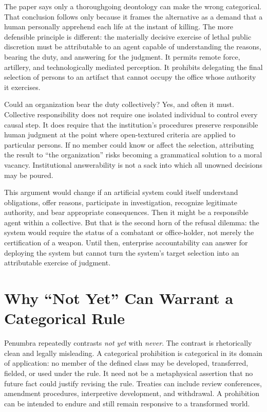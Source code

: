 \documentclass[11pt]{article}
\begin{document}
The paper says only a thoroughgoing deontology can make the wrong categorical. That conclusion follows only because it frames the alternative as a demand that a human personally apprehend each life at the instant of killing. The more defensible principle is different: the materially decisive exercise of lethal public discretion must be attributable to an agent capable of understanding the reasons, bearing the duty, and answering for the judgment. It permits remote force, artillery, and technologically mediated perception. It prohibits delegating the final selection of persons to an artifact that cannot occupy the office whose authority it exercises.

Could an organization bear the duty collectively? Yes, and often it must. Collective responsibility does not require one isolated individual to control every causal step. It does require that the institution's procedures preserve responsible human judgment at the point where open-textured criteria are applied to particular persons. If no member could know or affect the selection, attributing the result to ``the organization'' risks becoming a grammatical solution to a moral vacancy. Institutional answerability is not a sack into which all unowned decisions may be poured.

This argument would change if an artificial system could itself understand obligations, offer reasons, participate in investigation, recognize legitimate authority, and bear appropriate consequences. Then it might be a responsible agent within a collective. But that is the second horn of the refusal dilemma: the system would require the status of a combatant or office-holder, not merely the certification of a weapon. Until then, enterprise accountability can answer for deploying the system but cannot turn the system's target selection into an attributable exercise of judgment.

\section{Why ``Not Yet'' Can Warrant a Categorical Rule}
\label{sec:notyet}

Penumbra repeatedly contrasts \emph{not yet} with \emph{never}. The contrast is rhetorically clean and legally misleading. A categorical prohibition is categorical in its domain of application: no member of the defined class may be developed, transferred, fielded, or used under the rule. It need not be a metaphysical assertion that no future fact could justify revising the rule. Treaties can include review conferences, amendment procedures, interpretive development, and withdrawal. A prohibition can be intended to endure and still remain responsive to a transformed world.
\end{document}
